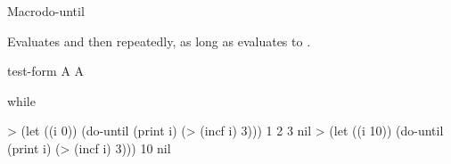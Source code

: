 \documentclass[10pt,twoside,english,pdftex]{article}
\begin{document}
\begin{functiondoc}{Macro}{do-until}{} 
%
  
\fnsyntax

\fnpurpose Evaluates  and then 
repeatedly, as long as  evaluates to \nil.

\fnpackage {}

\fnmodule {}

\fnargs
\begin{args}{test-form}
\arg[form] A 
 A 
\end{args}

\begin{alsos}{while}
\also[until]
\also[while]
\end{alsos}

\fnexamples
%
\W\supp
\begin{example}
> (let ((i 0)) 
    (do-until (print i)
        (> (incf i) 3)))
1 
2 
3 
nil\goodpagebreak
> (let ((i 10)) 
    (do-until (print i)
        (> (incf i) 3)))
10
nil
\end{example}

\end{functiondoc}

\end{document}

